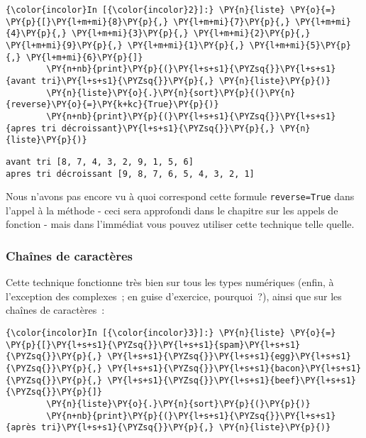     \begin{Verbatim}[commandchars=\\\{\}]
{\color{incolor}In [{\color{incolor}2}]:} \PY{n}{liste} \PY{o}{=} \PY{p}{[}\PY{l+m+mi}{8}\PY{p}{,} \PY{l+m+mi}{7}\PY{p}{,} \PY{l+m+mi}{4}\PY{p}{,} \PY{l+m+mi}{3}\PY{p}{,} \PY{l+m+mi}{2}\PY{p}{,} \PY{l+m+mi}{9}\PY{p}{,} \PY{l+m+mi}{1}\PY{p}{,} \PY{l+m+mi}{5}\PY{p}{,} \PY{l+m+mi}{6}\PY{p}{]}
        \PY{n+nb}{print}\PY{p}{(}\PY{l+s+s1}{\PYZsq{}}\PY{l+s+s1}{avant tri}\PY{l+s+s1}{\PYZsq{}}\PY{p}{,} \PY{n}{liste}\PY{p}{)}
        \PY{n}{liste}\PY{o}{.}\PY{n}{sort}\PY{p}{(}\PY{n}{reverse}\PY{o}{=}\PY{k+kc}{True}\PY{p}{)}
        \PY{n+nb}{print}\PY{p}{(}\PY{l+s+s1}{\PYZsq{}}\PY{l+s+s1}{apres tri décroissant}\PY{l+s+s1}{\PYZsq{}}\PY{p}{,} \PY{n}{liste}\PY{p}{)}
\end{Verbatim}


    \begin{Verbatim}[commandchars=\\\{\}]
avant tri [8, 7, 4, 3, 2, 9, 1, 5, 6]
apres tri décroissant [9, 8, 7, 6, 5, 4, 3, 2, 1]

    \end{Verbatim}

    Nous n'avons pas encore vu à quoi correspond cette formule
\texttt{reverse=True} dans l'appel à la méthode - ceci sera approfondi
dans le chapitre sur les appels de fonction - mais dans l'immédiat vous
pouvez utiliser cette technique telle quelle.

    \hypertarget{chauxeenes-de-caractuxe8res}{%
\subsubsection{Chaînes de
caractères}\label{chauxeenes-de-caractuxe8res}}

    Cette technique fonctionne très bien sur tous les types numériques
(enfin, à l'exception des complexes~; en guise d'exercice, pourquoi~?),
ainsi que sur les chaînes de caractères~:

    \begin{Verbatim}[commandchars=\\\{\}]
{\color{incolor}In [{\color{incolor}3}]:} \PY{n}{liste} \PY{o}{=} \PY{p}{[}\PY{l+s+s1}{\PYZsq{}}\PY{l+s+s1}{spam}\PY{l+s+s1}{\PYZsq{}}\PY{p}{,} \PY{l+s+s1}{\PYZsq{}}\PY{l+s+s1}{egg}\PY{l+s+s1}{\PYZsq{}}\PY{p}{,} \PY{l+s+s1}{\PYZsq{}}\PY{l+s+s1}{bacon}\PY{l+s+s1}{\PYZsq{}}\PY{p}{,} \PY{l+s+s1}{\PYZsq{}}\PY{l+s+s1}{beef}\PY{l+s+s1}{\PYZsq{}}\PY{p}{]}
        \PY{n}{liste}\PY{o}{.}\PY{n}{sort}\PY{p}{(}\PY{p}{)}
        \PY{n+nb}{print}\PY{p}{(}\PY{l+s+s1}{\PYZsq{}}\PY{l+s+s1}{après tri}\PY{l+s+s1}{\PYZsq{}}\PY{p}{,} \PY{n}{liste}\PY{p}{)}
\end{Verbatim}



